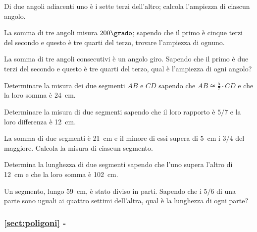 \begin{multicols}{2}
\begin{esercizio}
\label{ese:1.117}
Di due angoli adiacenti uno è i sette terzi dell'altro; calcola 
l'ampiezza di ciascun angolo.
\end{esercizio}

\begin{esercizio}
\label{ese:1.118}
La somma di tre angoli misura \(200\grado\); sapendo che il primo è 
cinque terzi del secondo e questo è tre quarti del terzo, trovare 
l'ampiezza di ognuno.
\end{esercizio}

\begin{esercizio}
\label{ese:1.119}
La somma di tre angoli consecutivi è un angolo giro. Sapendo che il 
primo è due terzi del secondo e questo è tre quarti del terzo, qual è 
l'ampiezza di ogni angolo?
\end{esercizio}

\begin{esercizio}
\label{ese:1.120}
Determinare la misura dei due segmenti \(AB\) e \(CD\) sapendo che 
\(AB\cong \frac{5}{7}\cdot CD\) e che la loro somma è 24~cm.
\end{esercizio}

\begin{esercizio}
\label{ese:1.121}
Determinare la misura di due segmenti sapendo che il loro rapporto è 
\(5/7\) e la loro differenza è 12~cm.
\end{esercizio}

\begin{esercizio}
\label{ese:1.122}
La somma di due segmenti è 21~cm e il minore di essi supera di 5~cm i 
\(3/4\) del maggiore. Calcola la misura di ciascun segmento.
\end{esercizio}

\begin{esercizio}
\label{ese:1.123}
Determina la lunghezza di due segmenti sapendo che l'uno supera 
l'altro di 12~cm e che la loro somma è 102~cm.
\end{esercizio}

\begin{esercizio}
\label{ese:1.124}
Un segmento, lungo 59~cm, è stato diviso in parti. Sapendo che i 
\(5/6\) di una parte sono uguali ai quattro settimi dell'altra, qual è 
la lunghezza di ogni parte?
\end{esercizio}

\end{multicols}

\begingroup
\hypersetup{linkcolor=black}
\subsubsection*{\ref{sect:poligoni} - }
\endgroup

